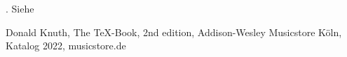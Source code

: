 \documentclass[12pt,ngerman,parskip=full]{scrartcl}
\begin{document}
\blindtext. Siehe \cite{knuth:84}


\begin{thebibliography}{9}
 Donald Knuth, The \TeX-Book, 2nd edition, Addison-Wesley
 Musicstore Köln, Katalog 2022, musicstore.de
\end{thebibliography}
\end{document}
